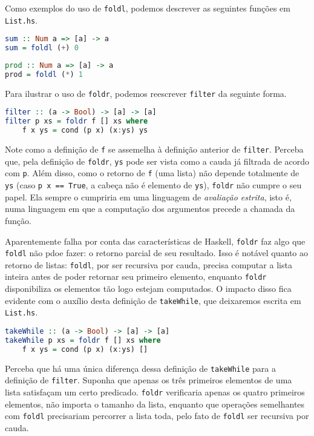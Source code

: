 \documentclass[a4paper]{article}
\begin{document}
Como exemplos do uso de \texttt{foldl}, podemos descrever as seguintes funções em \texttt{List.hs}.

\begin{lstlisting}[language=haskell, frame=single]
sum :: Num a => [a] -> a
sum = foldl (+) 0 
\end{lstlisting}

\begin{lstlisting}[language=haskell, frame=single]
prod :: Num a => [a] -> a
prod = foldl (*) 1 
\end{lstlisting}

Para ilustrar o uso de \texttt{foldr}, podemos reescrever \texttt{filter} da seguinte forma.

\begin{lstlisting}[language=haskell, frame=single]
filter :: (a -> Bool) -> [a] -> [a]
filter p xs = foldr f [] xs where
	f x ys = cond (p x) (x:ys) ys
\end{lstlisting}

Note como a definição de \texttt{f} se assemelha à definição anterior de \texttt{filter}.
Perceba que, pela definição de \texttt{foldr}, \texttt{ys} pode ser vista como a cauda já filtrada de acordo com \texttt{p}.
Além disso, como o retorno de \texttt{f} (uma lista) não depende totalmente de \texttt{ys} (caso \texttt{p x == True}, a cabeça não é elemento de \texttt{ys}), \texttt{foldr} não cumpre o seu papel.
Ela sempre o cumpriria em uma linguagem de \emph{avaliação estrita}, isto é, numa linguagem em que a computação dos argumentos precede a chamada da função.

Aparentemente falha por conta das características de Haskell, \texttt{foldr} faz algo que \texttt{foldl} não pdoe fazer: o retorno parcial de seu resultado.
Isso é notável quanto ao retorno de listas: \texttt{foldl}, por ser recursiva por cauda, precisa computar a lista inteira antes de poder retornar seu primeiro elemento, enquanto \texttt{foldr} disponibiliza os elementos tão logo estejam computados.
O impacto disso fica evidente com o auxílio desta definição de \texttt{takeWhile}, que deixaremos escrita em \texttt{List.hs}.

\begin{lstlisting}[language=haskell, frame=single]
takeWhile :: (a -> Bool) -> [a] -> [a]
takeWhile p xs = foldr f [] xs where
	f x ys = cond (p x) (x:ys) []
\end{lstlisting}

Perceba que há uma única diferença dessa definição de \texttt{takeWhile} para a definição de \texttt{filter}.
Suponha que apenas os três primeiros elementos de uma lista satisfaçam um certo predicado.
\texttt{foldr} verificaria apenas os quatro primeiros elementos, não importa o tamanho da lista, enquanto que operações semelhantes com \texttt{foldl} precisariam percorrer a lista toda, pelo fato de \texttt{foldl} ser recursiva por cauda.
\end{document}
